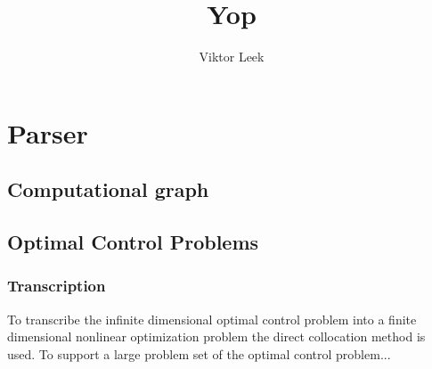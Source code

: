 \documentclass{article}
\begin{document}
\title{Yop }
\author{Viktor Leek}

\maketitle

\section{Parser}

\subsection{Computational graph}

\subsection{Optimal Control Problems}


\subsubsection{Transcription}
To transcribe the infinite dimensional optimal control problem into a finite dimensional nonlinear optimization problem the direct collocation method is used. To support a large problem set of the optimal control problem...
\end{document}
